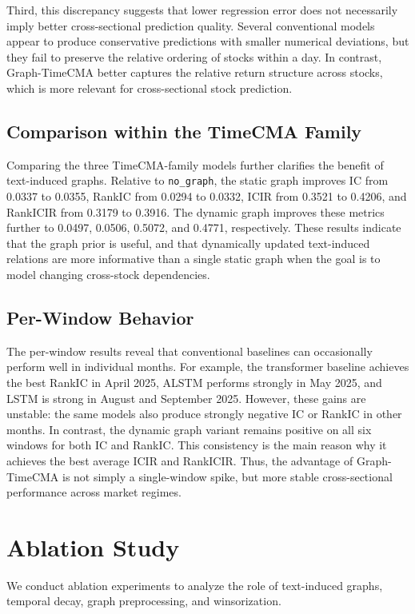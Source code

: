 Third, this discrepancy suggests that lower regression error does not necessarily imply better cross-sectional prediction quality. Several conventional models appear to produce conservative predictions with smaller numerical deviations, but they fail to preserve the relative ordering of stocks within a day. In contrast, Graph-TimeCMA better captures the relative return structure across stocks, which is more relevant for cross-sectional stock prediction.

\subsection{Comparison within the TimeCMA Family}

Comparing the three TimeCMA-family models further clarifies the benefit of text-induced graphs. Relative to \texttt{no\_graph}, the static graph improves IC from 0.0337 to 0.0355, RankIC from 0.0294 to 0.0332, ICIR from 0.3521 to 0.4206, and RankICIR from 0.3179 to 0.3916. The dynamic graph improves these metrics further to 0.0497, 0.0506, 0.5072, and 0.4771, respectively. These results indicate that the graph prior is useful, and that dynamically updated text-induced relations are more informative than a single static graph when the goal is to model changing cross-stock dependencies.

\subsection{Per-Window Behavior}

The per-window results reveal that conventional baselines can occasionally perform well in individual months. For example, the transformer baseline achieves the best RankIC in April 2025, ALSTM performs strongly in May 2025, and LSTM is strong in August and September 2025. However, these gains are unstable: the same models also produce strongly negative IC or RankIC in other months. In contrast, the dynamic graph variant remains positive on all six windows for both IC and RankIC. This consistency is the main reason why it achieves the best average ICIR and RankICIR. Thus, the advantage of Graph-TimeCMA is not simply a single-window spike, but more stable cross-sectional performance across market regimes.

\section{Ablation Study}

We conduct ablation experiments to analyze the role of text-induced graphs, temporal decay, graph preprocessing, and winsorization.

